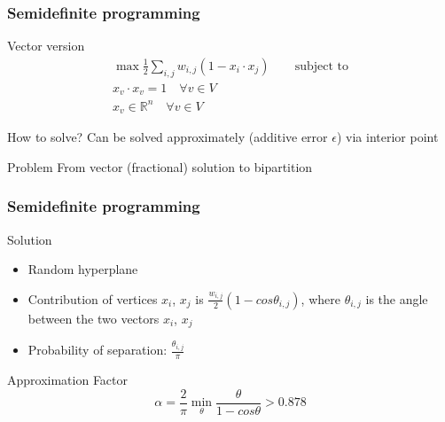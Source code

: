 \documentclass[12pt,aspectratio=169]{beamer}
\begin{document}
\begin{frame}\frametitle{Semidefinite programming}
  \begin{block}{Vector version}
  \begin{equation}
    \begin{split}
      \max \frac{1}{2}\sum_{i,j} w_{i,j}(1 - x_{i}\cdot x_{j})\qquad\text{subject to}\\
      x_{v} \cdot x_{v} =1\quad \forall v\in V\\
      x_{v}\in \mathbb{R}^{n}\quad \forall v\in V
     \end{split}
   \end{equation}
 \end{block}
  \begin{block}{How to solve?}
    Can be solved approximately (additive error $\epsilon$) via interior point
  \end{block}
  \begin{block}{Problem}
    From vector (fractional) solution to bipartition
  \end{block}
\end{frame}

\begin{frame}\frametitle{Semidefinite programming}
  \begin{block}{Solution}
    \begin{itemize}
      \item
        Random hyperplane
      \item
        Contribution of vertices $x_{i}$, $x_{j}$ is $\frac{w_{i,j}}{2}\left( 1 - cos
          \theta_{i,j}\right)$, where $\theta_{i,j}$ is the angle between the two vectors
        $x_{i}$, $x_{j}$
      \item
        Probability of separation: $\frac{\theta_{i,j}}{\pi}$
      \end{itemize}
    \end{block}
  \begin{block}{Approximation Factor}
    \begin{equation}
      \alpha = \frac{2}{\pi} \min_{\theta} \frac{\theta}{1- cos \theta} > 0.878
    \end{equation}
  \end{block}
\end{frame}


\end{document}
